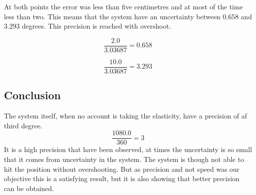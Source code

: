 At both points the error was less than five centimetres and at most of the time less than two. This means that the system have an uncertainty between 0.658 and 3.293 degrees. This precision is reached with overshoot.

\[ \frac{2.0}{3.03687} = 0.658 \]

\[ \frac{10.0}{3.03687} = 3.293 \]

\subsection{Conclusion}

The system itself, when no account is taking the elasticity, have a precision of af third degree.
\[ \frac{1080.0}{360} = 3 \]
It is a high precision that have been observed, at times the uncertainty is so small that it comes from uncertainty in the system. The system is though not able to hit the position without overshooting. But as precision and not speed was our objective this is a satisfying result, but it is also showing that better precision can be obtained.
